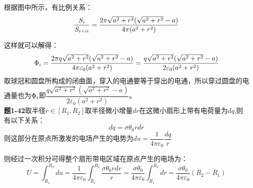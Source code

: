 \documentclass{article}
\begin{document}
根据图中所示，有比例关系：
\begin{equation}
	\dfrac{S_{\uppercase\expandafter{\romannumeral1}}}{S_{\uppercase\expandafter{\romannumeral1}+\uppercase\expandafter{\romannumeral2}}} = \dfrac{2\pi \sqrt{a
	^2+r^2}(\sqrt{a^2+r^2}-a)}{4\pi (a^2 + r^2)}
\end{equation}

这样就可以解得：
\begin{equation}
	\Phi _{\uppercase\expandafter{\romannumeral1}} = \dfrac{2\pi q\sqrt{a
	^2+r^2}(\sqrt{a^2+r^2}-a)}{4\pi \varepsilon_0(a^2 + r^2)}
	=\dfrac{q\sqrt{a^2+r^2}(\sqrt{a^2+r^2}-a)}{2\varepsilon_0(a^2 + r^2)}
\end{equation}
取球冠和圆盘所构成的闭曲面，穿入的电通要等于穿出的电通，所以穿过圆盘的电通量也为$\Phi _{\uppercase\expandafter{\romannumeral1}}$即$\dfrac{q\sqrt{a^2+r^2}(\sqrt{a^2+r^2}-a)}{2\varepsilon_0(a^2 + r^2)}$。\\



\textbf{题1-42}取半径$r\in [R_1,R_2]$取半径微小增量$dr$在这微小扇形上带有电荷量为$dq$,则有以下关系：
\begin{equation}
		dq = \sigma \theta_0 r dr 
\end{equation}
则这部分在原点所激发的电场产生的电势为$du=\dfrac{1}{4\pi \varepsilon_0}\dfrac{dq}{r} $

则经过一次积分可得整个扇形带电区域在原点产生的电场为：
\begin{equation}
	U = \int_{R_1}^{R_2}du = \dfrac{1}{4\pi \varepsilon_0}\int_{R_1}^{R_2}\dfrac{ \sigma \theta_0 r dr }{r} =\dfrac{\sigma \theta_0}{4\pi \varepsilon_0}\int_{R_1}^{R_2}dr=\dfrac{\sigma \theta_0}{4\pi \varepsilon_0}(R_2-R_1)
\end{equation}
	
\end{document}
